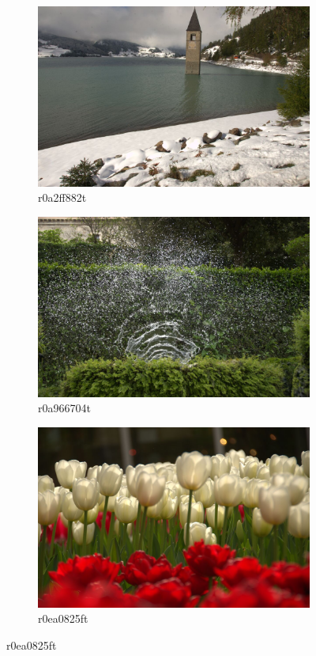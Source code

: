 \documentclass{ipol}
\begin{document}
\begin{figure}[ht]
    \begin{subfigure}[c]{.31\linewidth}\centering
    \includegraphics[width=\linewidth]{images/original/r1c9fdcf4t.jpeg}
    \caption{r0a2ff882t}
    \end{subfigure}\hfill%
    \begin{subfigure}[c]{.31\linewidth}\centering
    \includegraphics[width=\linewidth]{images/original/r06aa7dabt.jpeg}
    \caption{r0a966704t}
    \end{subfigure}\hfill%
    \begin{subfigure}[c]{.31\linewidth}\centering
    \includegraphics[width=\linewidth]{images/original/r07cfb432t.jpeg}
    \caption{r0ea0825ft}
    \end{subfigure}
    

\end{figure}
\end{document}
